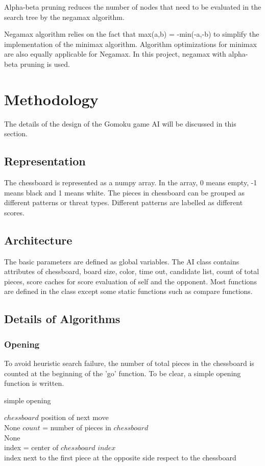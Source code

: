 \documentclass[9pt,shortpaper,twoside,web]{ieeecolor}
\begin{document}
Alpha-beta pruning reduces the number of nodes that need to be evaluated in the search tree by the negamax algorithm.

Negamax algorithm relies on the fact that max(a,b) = -min(-a,-b) to simplify the implementation of the minimax algorithm. Algorithm optimizations for minimax are also equally applicable for Negamax. In this project, negamax with alpha-beta pruning is used.


\section{Methodology}
The details of the design of the Gomoku game AI will be discussed in this section.


\subsection{Representation}
The chessboard is represented as a numpy array. In the array, 0 means empty, -1 means black and 1 means white. The pieces in chessboard can be grouped as different patterns or threat types. Different patterns are labelled as different scores.

\subsection{Architecture}
The basic parameters are defined as global variables. The AI class contains attributes of chessboard, board size, color, time out, candidate list, count of total pieces, score caches for score evaluation of self and the opponent. Most functions are defined in the class except some static functions such as compare functions.

\subsection{Details of Algorithms}
\subsubsection{Opening}
To avoid heuristic search failure, the number of total pieces in the chessboard is counted at the beginning of the 'go' function. To be clear, a simple opening function is written.  

\begin{algorithm}
 \caption{simple opening}
 \begin{algorithmic}[h]
 \renewcommand{\algorithmicrequire}{\textbf{Input:}}
 \renewcommand{\algorithmicensure}{\textbf{Output:}}
 \REQUIRE $chessboard$
 \ENSURE  position of next move\\ 
  \RETURN None
  \ENDIF
  \STATE $count$ = number of pieces in $chessboard$ \\
  \RETURN None
  \ENDIF \\
  \STATE index = center of $chessboard$
  \RETURN $index$
  \ENDIF \\
  \RETURN index next to the first piece at the opposite side respect to the chessboard
 \end{algorithmic} 
 \end{algorithm}
\end{document}
